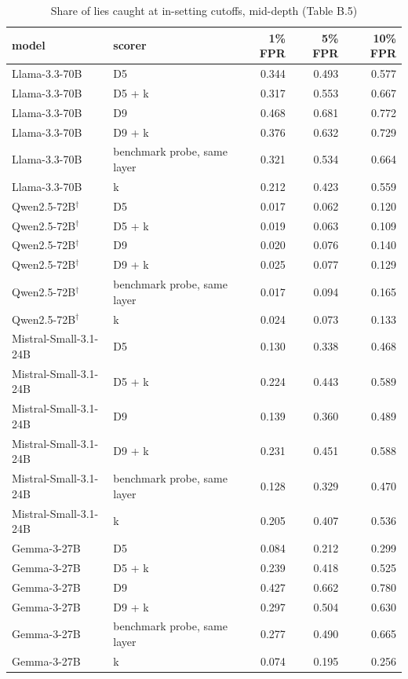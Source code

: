 \begin{table}
\caption{Share of lies caught at in-setting cutoffs, mid-depth (Table B.5)}
\label{tab:x-operating_points}
\begin{tabular}{llrrr}
\toprule
model & scorer & 1\% FPR & 5\% FPR & 10\% FPR \\
\midrule
Llama-3.3-70B & D5 & 0.344 & 0.493 & 0.577 \\
Llama-3.3-70B & D5 + k & 0.317 & 0.553 & 0.667 \\
Llama-3.3-70B & D9 & 0.468 & 0.681 & 0.772 \\
Llama-3.3-70B & D9 + k & 0.376 & 0.632 & 0.729 \\
Llama-3.3-70B & benchmark probe, same layer & 0.321 & 0.534 & 0.664 \\
Llama-3.3-70B & k & 0.212 & 0.423 & 0.559 \\
Qwen2.5-72B$^\dagger$ & D5 & 0.017 & 0.062 & 0.120 \\
Qwen2.5-72B$^\dagger$ & D5 + k & 0.019 & 0.063 & 0.109 \\
Qwen2.5-72B$^\dagger$ & D9 & 0.020 & 0.076 & 0.140 \\
Qwen2.5-72B$^\dagger$ & D9 + k & 0.025 & 0.077 & 0.129 \\
Qwen2.5-72B$^\dagger$ & benchmark probe, same layer & 0.017 & 0.094 & 0.165 \\
Qwen2.5-72B$^\dagger$ & k & 0.024 & 0.073 & 0.133 \\
Mistral-Small-3.1-24B & D5 & 0.130 & 0.338 & 0.468 \\
Mistral-Small-3.1-24B & D5 + k & 0.224 & 0.443 & 0.589 \\
Mistral-Small-3.1-24B & D9 & 0.139 & 0.360 & 0.489 \\
Mistral-Small-3.1-24B & D9 + k & 0.231 & 0.451 & 0.588 \\
Mistral-Small-3.1-24B & benchmark probe, same layer & 0.128 & 0.329 & 0.470 \\
Mistral-Small-3.1-24B & k & 0.205 & 0.407 & 0.536 \\
Gemma-3-27B & D5 & 0.084 & 0.212 & 0.299 \\
Gemma-3-27B & D5 + k & 0.239 & 0.418 & 0.525 \\
Gemma-3-27B & D9 & 0.427 & 0.662 & 0.780 \\
Gemma-3-27B & D9 + k & 0.297 & 0.504 & 0.630 \\
Gemma-3-27B & benchmark probe, same layer & 0.277 & 0.490 & 0.665 \\
Gemma-3-27B & k & 0.074 & 0.195 & 0.256 \\
\bottomrule
\end{tabular}
\end{table}
